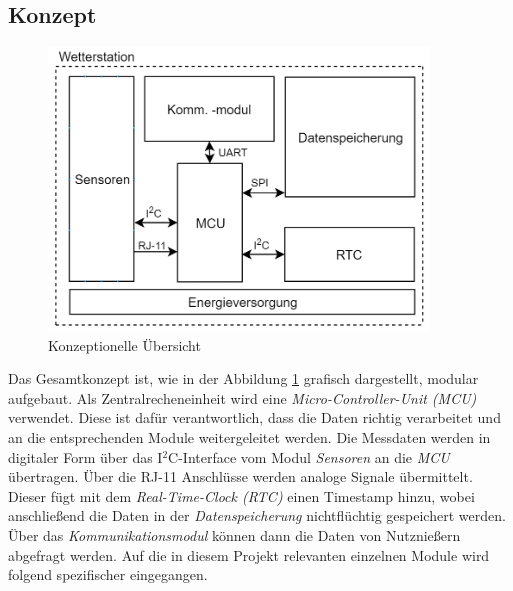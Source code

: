 \subsection{Konzept}
\label{subsec:Konzept}
\begin{figure}[h]
	\centering
	\includegraphics[width=0.9\textwidth]{graphics/Konzeptdiagramme/Grundkonzept.PNG}	
	\caption{Konzeptionelle Übersicht}
	\label{fig:grundkonzept}
\end{figure}

Das Gesamtkonzept ist, wie in der Abbildung \ref{fig:grundkonzept} grafisch dargestellt, modular aufgebaut. Als Zentralrecheneinheit wird eine \textit{Micro-Controller-Unit (MCU)} verwendet. Diese ist dafür verantwortlich, dass die Daten richtig verarbeitet und an die entsprechenden Module weitergeleitet werden. Die Messdaten werden in digitaler Form über das I$^{2}$C-Interface vom Modul \textit{Sensoren} an die \textit{MCU} übertragen. Über die RJ-11 Anschlüsse werden analoge Signale übermittelt. Dieser fügt mit dem \textit{Real-Time-Clock (RTC)} einen Timestamp hinzu, wobei anschließend die Daten in der \textit{Datenspeicherung} nichtflüchtig gespeichert werden. Über das \textit{Kommunikationsmodul} können dann die Daten von Nutznießern abgefragt werden. Auf die in diesem Projekt relevanten einzelnen Module wird folgend spezifischer eingegangen.\\

\newpage






